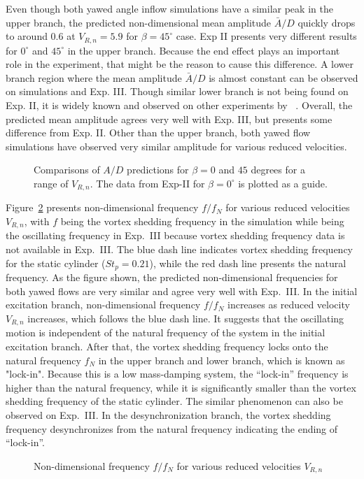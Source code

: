 Even though both yawed angle inflow simulations have a similar peak in the
upper branch, the predicted non-dimensional mean amplitude $\bar{A}/D$ quickly
drops to around 0.6 at $V_{R,n}=5.9$ for $\beta=45^\circ$ case. Exp II presents
very different results for $0^\circ$ and $45^\circ$ in the upper branch.
Because the end effect plays an important role in the experiment, that might be
the reason to cause this difference.  A lower branch region where the mean
amplitude $\bar{A}/D$ is almost constant can be observed on simulations and
Exp. III.  Though similar lower branch is not being found on Exp. II, it is
widely known and observed on other experiments by ~\cite{govardhan2000modes}.
Overall, the predicted mean amplitude agrees very well with Exp. III, but
presents some difference from Exp. II. Other than the upper branch, both yawed
flow simulations have observed very similar amplitude for various reduced
velocities. 
%
\begin{figure}[htb!]
  \caption{Comparisons of $A/D$ predictions for $\beta=0$ and $45$ degrees
    for a range of $V_{R,n}$. The data from Exp-II for $\beta=0^\circ$ is
    plotted as a guide.}
  \label{fig:f_VIV}
\end{figure}

Figure~\ref{fig:f_VIV} presents non-dimensional frequency $f/f_N$ for various
reduced velocities $V_{R,n}$, with $f$ being the vortex shedding frequency in
the simulation while being the oscillating frequency in Exp.~III because vortex
shedding frequency data is not available in Exp.~III. The blue dash line
indicates vortex shedding frequency for the static cylinder ($St_p=0.21$),
while the red dash line presents the natural frequency.  As the figure shown,
the predicted non-dimensional frequencies for both yawed flows are very similar
and agree very well with Exp.~III.  In the initial excitation branch,
non-dimensional frequency $f/f_N$ increases as reduced velocity $V_{R,n}$
increases, which follows the blue dash line. It suggests that the oscillating
motion is independent of the natural frequency of the system in the initial
excitation branch. After that, the vortex shedding frequency locks onto the
natural frequency $f_N$ in the upper branch and lower branch, which is known as
"lock-in". Because this is a low mass-damping system, the ``lock-in'' frequency
is higher than the natural frequency, while it is significantly smaller than
the vortex shedding frequency of the static cylinder. The similar phenomenon
can also be observed on Exp.~III.  In the desynchronization branch, the vortex
shedding frequency desynchronizes from the natural frequency indicating the
ending of ``lock-in''.
%
\begin{figure}[htb!]
  \caption{Non-dimensional frequency $f/f_N$ for various reduced velocities
    $V_{R,n}$}
  \label{fig:f_VIV}
\end{figure}

